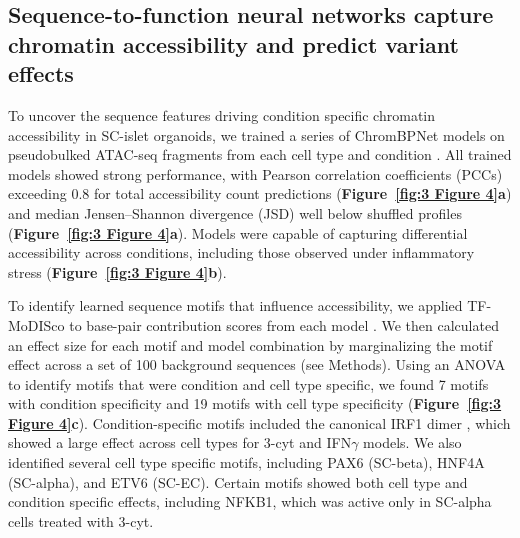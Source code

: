 \clearpage


\subsection{Sequence-to-function neural networks capture chromatin accessibility and predict variant effects}

To uncover the sequence features driving condition specific chromatin accessibility in SC-islet organoids, we trained a series of ChromBPNet models on pseudobulked ATAC-seq fragments from each cell type and condition \cite{Pampari2025-lm}. All trained models showed strong performance, with Pearson correlation coefficients (PCCs) exceeding 0.8 for total accessibility count predictions (\textbf{Figure~\ref{fig:3 Figure 4}\textbf{a}}) and median Jensen–Shannon divergence (JSD) well below shuffled profiles (\textbf{Figure~\ref{fig:3 Figure 4}\textbf{a}}). Models were capable of capturing differential accessibility across conditions, including those observed under inflammatory stress (\textbf{Figure~\ref{fig:3 Figure 4}\textbf{b}}).

To identify learned sequence motifs that influence accessibility, we applied TF-MoDISco to base-pair contribution scores from each model \cite{Shrikumar2018-sb}. We then calculated an effect size for each motif and model combination by marginalizing the motif effect across a set of 100 background sequences (see Methods). Using an ANOVA to identify motifs that were condition and cell type specific, we found 7 motifs with condition specificity and 19 motifs with cell type specificity (\textbf{Figure~\ref{fig:3 Figure 4}\textbf{c}}). Condition-specific motifs included the canonical IRF1 dimer \cite{Kirchhoff1998-xj}, which showed a large effect across cell types for 3-cyt and IFN$\gamma$ models. We also identified several cell type specific motifs, including PAX6 (SC-beta), HNF4A (SC-alpha), and ETV6 (SC-EC). Certain motifs showed both cell type and condition specific effects, including NFKB1, which was active only in SC-alpha cells treated with 3-cyt. 

